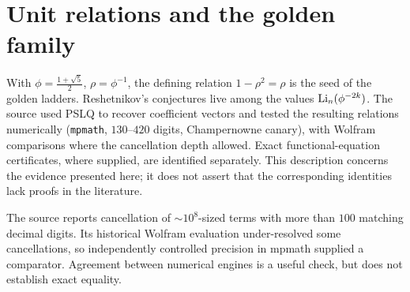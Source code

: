 \section{Unit relations and the golden family}
With $\phi=\tfrac{1+\sqrt5}2$, $\rho=\phi^{-1}$, the defining relation $1-\rho^2=\rho$ is the seed of the
golden ladders. Reshetnikov's conjectures live among the values $\operatorname{Li}_n(\phi^{-2k})$.
The source used PSLQ to recover coefficient vectors and tested the resulting
relations numerically (\texttt{mpmath}, $130$--$420$ digits, Champernowne
canary), with Wolfram comparisons where the cancellation depth allowed.
Exact functional-equation certificates, where supplied, are identified
separately. This description concerns the evidence presented here; it does
not assert that the corresponding identities lack proofs in the literature.
\begin{remark}
The source reports cancellation of $\sim10^8$-sized terms with more
than $100$ matching decimal digits. Its historical Wolfram evaluation
under-resolved some cancellations, so independently controlled precision
in mpmath supplied a comparator. Agreement between numerical engines is
a useful check, but does not establish exact equality.
\end{remark}

